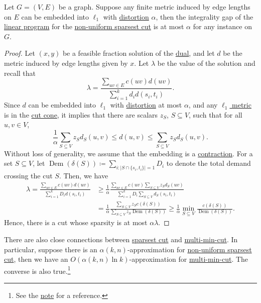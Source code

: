\begin{theorem}
	Let \(G = (V, E)\) be a graph. Suppose any finite metric induced by edge lengths on \(E\) can be embedded into \(\ell _1\) with \hyperref[def:distortion]{distortion} \(\alpha \), then the integrality gap of the \hyperref[eq:non-uniform-sparsest-cut-LP-primal]{linear program} for the \hyperref[prb:non-uniform-sparsest-cut]{non-uniform sparsest cut} is at most \(\alpha \) for any instance on \(G\).
\end{theorem}
\begin{proof}
	Let \((x, y)\) be a feasible fraction solution of the \hyperref[eq:non-uniform-sparsest-cut-LP-dual]{dual}, and let \(d\) be the metric induced by edge lengths given by \(x\). Let \(\lambda \) be the value of the solution and recall that
	\[
		\lambda = \frac{\sum_{uv \in E} c(uv) d(uv)}{\sum_{i=1}^{k} d_i d(s_i, t_i)}.
	\]
	Since \(d\) can be embedded into \(\ell _1\) with \hyperref[def:distortion]{distortion} at most \(\alpha \), and any \hyperref[def:l1-metric]{\(\ell _1\) metric} is in the \hyperref[def:cut-cone]{cut cone}, it implies that there are scalars \(z_S\), \(S \subseteq V\), such that for all \(u, v \in V\),
	\[
		\frac{1}{\alpha } \sum_{S \subseteq V}  z_S d_S(u, v)
		\leq d(u, v)
		\leq \sum_{S \subseteq V} z_S d_S(u, v).
	\]
	Without loss of generality, we assume that the embedding is a \hyperref[def:contraction]{contraction}. For a set \(S \subseteq V\), let \(\operatorname{Dem}(\delta (S)) \coloneqq \sum_{i \colon \lvert S \cap \{ s_i, t_i \} \rvert = 1} D_i \) to denote the total demand crossing the cut \(S\). Then, we have
	\[
		\begin{split}
			\lambda
			= \frac{\sum_{uv \in E} c(uv) d(uv)}{\sum_{i=1}^{k} D_i d(s_i, t_i)}
			 & \geq \frac{1}{\alpha } \frac{\sum_{uv \in E} c(uv) \sum_{S \subseteq V} z_S d_S(uv)}{\sum_{i=1}^{k} D_i \sum_{S \subseteq V} d_S(s_i, t_i)} \\
			 & = \frac{1}{\alpha } \frac{\sum_{S \subseteq V} z_S c(\delta (S))}{\sum_{S \subseteq V} z_S \operatorname{Dem}(\delta (S))  }
			\geq \frac{1}{\alpha } \min _{S \subseteq V} \frac{c(\delta (S))}{\operatorname{Dem}(\delta (S)) }.
		\end{split}
	\]
	Hence, there is a cut whose sparsity is at most \(\alpha \lambda \).
\end{proof}

\begin{remark}
	There are also close connections between \hyperref[prb:non-uniform-sparsest-cut]{sparsest cut} and \hyperref[prb:multi-min-cut]{multi-min-cut}. In particular, suppose there is an \(\alpha (k, n)\)-approximation for \hyperref[prb:non-uniform-sparsest-cut]{non-uniform sparsest cut}, then we have an \(O(\alpha (k, n) \ln k)\)-approximation for \hyperref[prb:multi-min-cut]{multi-min-cut}. The converse is also true.\footnote{See the \href{https://courses.grainger.illinois.edu/cs598csc/fa2024/Notes/lec-sparsest-cut.pdf}{note} for a reference.}
\end{remark}